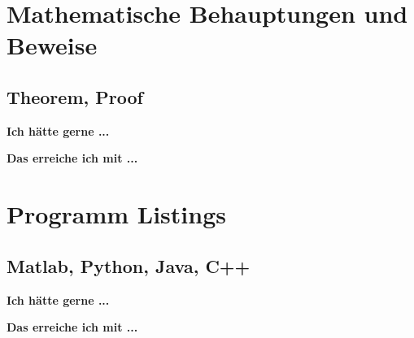 \documentclass[twoside, 
               a4paper, 
              10pt, 
               parskip=full, 
               sectionentrydots=true, 
               listof=totoc, 
               listof=entryprefix,
               numbers=endperiod]{scrartcl}
\begin{document}

\newpage
\section{Mathematische Behauptungen und Beweise}
\subsection{Theorem, Proof}

{\textbf {Ich hätte gerne ...}}
 
\begin{miniSeite}[colbacktitle=black!35!white,title=Ausdruck]

\end{miniSeite}


\newpage
{\textbf {Das erreiche ich mit ...}}
 
\begin{miniSeite}[colbacktitle=black!35!white,title=\LaTeX-Code]

\end{miniSeite}





\newpage
\section{Programm Listings}
\subsection{Matlab, Python, Java, C++}

{\textbf {Ich hätte gerne ...}}
 
\begin{miniSeite}[colbacktitle=black!35!white,title=Ausdruck]

\end{miniSeite}


\newpage
{\textbf {Das erreiche ich mit ...}}
 
\begin{miniSeite}[colbacktitle=black!35!white,title=\LaTeX-Code]

\end{miniSeite}

\end{document}
